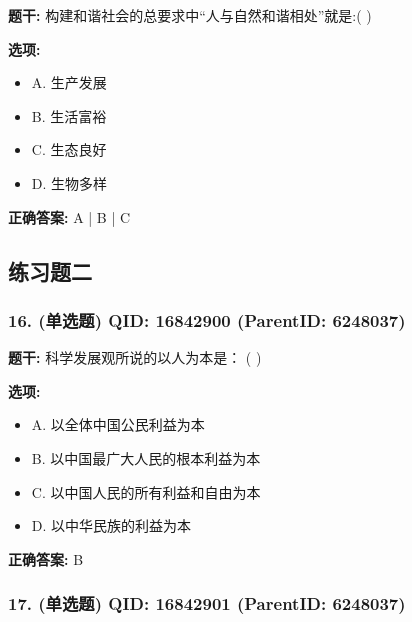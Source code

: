\documentclass[12pt,UTF8]{ctexart}
\begin{document}
\textbf{题干:}
构建和谐社会的总要求中“人与自然和谐相处”就是:( )



\textbf{选项:}
\begin{itemize}[leftmargin=*]

  \item A. 生产发展

  \item B. 生活富裕

  \item C. 生态良好

  \item D. 生物多样

\end{itemize}

\textbf{正确答案:}
A | B | C

\vspace{0.3em}\hrulefill\vspace{0.7em}

\subsection*{练习题二}

\subsubsection*{16. (单选题) \small QID: 16842900 (ParentID: 6248037)}

\textbf{题干:}
科学发展观所说的以人为本是： ( )



\textbf{选项:}
\begin{itemize}[leftmargin=*]

  \item A. 以全体中国公民利益为本

  \item B. 以中国最广大人民的根本利益为本

  \item C. 以中国人民的所有利益和自由为本

  \item D. 以中华民族的利益为本

\end{itemize}

\textbf{正确答案:}
B

\vspace{0.3em}\hrulefill\vspace{0.7em}

\subsubsection*{17. (单选题) \small QID: 16842901 (ParentID: 6248037)}
\end{document}
